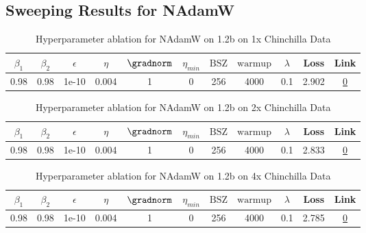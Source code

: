 \subsection{Sweeping Results for NAdamW}%
\begin{table}[H]
\centering
\caption{Hyperparameter ablation for NAdamW on 1.2b on 1x Chinchilla Data}
\label{tab:ablation_nadamw_1.2b_on_1x_chinchilla_data}
\begin{tabular}{ccccccccccc}
\toprule
$\beta_1$ & $\beta_2$ & $\epsilon$ & $\eta$ & $\gradnorm$ & $\eta_{min}$ & $\mathrm{BSZ}$ & $\mathrm{warmup}$ & $\lambda$ & Loss & Link \\
\midrule
0.98 & 0.98 & 1e-10 & 0.004 & 1 & 0 & 256 & 4000 & 0.1 & 2.902 & \href{https://wandb.ai/stanford-mercury/optimizer-scaling/runs/sweep-1.2b-24B-nadamwf62d1blr0.004-wd0.1-minlr0.0-warmup4000-b10-642070}{0} \\
\midrule
\bottomrule
\end{tabular}
\end{table}

\begin{table}[H]
\centering
\caption{Hyperparameter ablation for NAdamW on 1.2b on 2x Chinchilla Data}
\label{tab:ablation_nadamw_1.2b_on_2x_chinchilla_data}
\begin{tabular}{ccccccccccc}
\toprule
$\beta_1$ & $\beta_2$ & $\epsilon$ & $\eta$ & $\gradnorm$ & $\eta_{min}$ & $\mathrm{BSZ}$ & $\mathrm{warmup}$ & $\lambda$ & Loss & Link \\
\midrule
0.98 & 0.98 & 1e-10 & 0.004 & 1 & 0 & 256 & 4000 & 0.1 & 2.833 & \href{https://wandb.ai/stanford-mercury/optimizer-scaling/runs/sweep-1.2b-48B-nadamwcb7c09lr0.004-wd0.1-minlr0.0-warmup4000-b10-cf4ac5}{0} \\
\midrule
\bottomrule
\end{tabular}
\end{table}

\begin{table}[H]
\centering
\caption{Hyperparameter ablation for NAdamW on 1.2b on 4x Chinchilla Data}
\label{tab:ablation_nadamw_1.2b_on_4x_chinchilla_data}
\begin{tabular}{ccccccccccc}
\toprule
$\beta_1$ & $\beta_2$ & $\epsilon$ & $\eta$ & $\gradnorm$ & $\eta_{min}$ & $\mathrm{BSZ}$ & $\mathrm{warmup}$ & $\lambda$ & Loss & Link \\
\midrule
0.98 & 0.98 & 1e-10 & 0.004 & 1 & 0 & 256 & 4000 & 0.1 & 2.785 & \href{https://wandb.ai/stanford-mercury/optimizer-scaling/runs/sweep-1.2b-96B-nadamw8e7088lr0.004-wd0.1-minlr0.0-warmup4000-b10-3c3e6a}{0} \\
\midrule
\bottomrule
\end{tabular}
\end{table}

